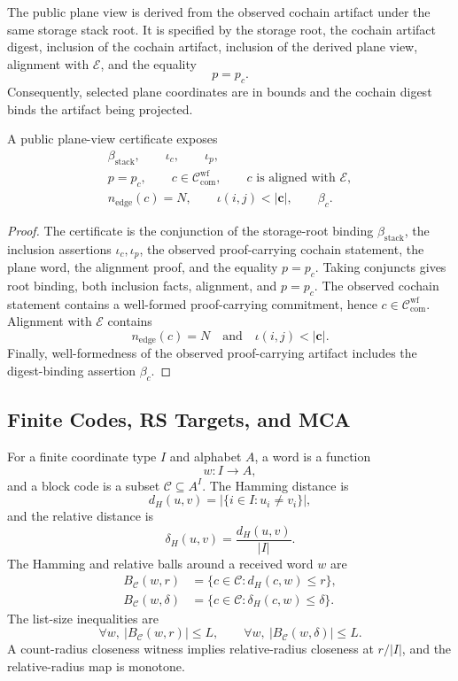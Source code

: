 The public plane view is derived from the observed cochain artifact under the
same storage stack root. It is specified by the storage root, the cochain artifact
digest, inclusion of the cochain artifact, inclusion of the derived plane view,
alignment with \(\mathcal E\), and the equality
\[
  p=p_c.
\]
Consequently, selected plane coordinates are in bounds and the cochain digest
binds the artifact being projected.

\begin{proposition}
\label{prop:public-plane-view-certificate}
A public plane-view certificate exposes
\[
\begin{gathered}
  \beta_{\mathrm{stack}},\qquad
  \iota_c,\qquad
  \iota_p,\\
  p=p_c,\qquad
  c\in\mathcal C_{\mathrm{com}}^{\mathrm{wf}},\qquad
  c\text{ is aligned with }\mathcal E,\\
  n_{\mathrm{edge}}(c)=N,\qquad
  \iota(i,j)<|\mathbf c|,\qquad
  \beta_c.
\end{gathered}
\]
\end{proposition}

\begin{proof}
The certificate is the conjunction of the storage-root binding
\(\beta_{\mathrm{stack}}\), the inclusion assertions \(\iota_c,\iota_p\), the
observed proof-carrying cochain statement, the plane word, the alignment proof,
and the equality \(p=p_c\). Taking conjuncts gives root binding, both inclusion
facts, alignment, and \(p=p_c\). The observed cochain statement contains a
well-formed proof-carrying commitment, hence
\(c\in\mathcal C_{\mathrm{com}}^{\mathrm{wf}}\). Alignment with
\(\mathcal E\) contains
\[
  n_{\mathrm{edge}}(c)=N
  \quad\text{and}\quad
  \iota(i,j)<|\mathbf c|.
\]
Finally, well-formedness of the observed proof-carrying artifact includes the
digest-binding assertion \(\beta_c\).
\end{proof}

\subsection{Finite Codes, RS Targets, and MCA}

For a finite coordinate type \(I\) and alphabet \(A\), a word is a function
\[
  w:I\to A,
\]
and a block code is a subset \(\mathcal C\subseteq A^I\). The Hamming distance is
\[
  d_H(u,v)=|\{i\in I:u_i\ne v_i\}|,
\]
and the relative distance is
\[
  \delta_H(u,v)=\frac{d_H(u,v)}{|I|}.
\]
The Hamming and relative balls around a received word \(w\) are
\[
\begin{aligned}
  B_{\mathcal C}(w,r)
    &=\{c\in \mathcal C:d_H(c,w)\le r\},\\
  B_{\mathcal C}(w,\delta)
    &=\{c\in \mathcal C:\delta_H(c,w)\le \delta\}.
\end{aligned}
\]
The list-size inequalities are
\[
  \forall w,\ |B_{\mathcal C}(w,r)|\le L,
  \qquad
  \forall w,\ |B_{\mathcal C}(w,\delta)|\le L.
\]
A count-radius closeness witness implies relative-radius closeness at
\(r/|I|\), and the relative-radius map is monotone.

